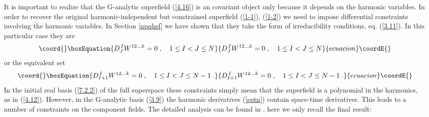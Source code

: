 \documentclass[a4paper,12pt]{article}
\begin{document}
It is important to realize that the G-analytic superfield 
(\ref{4.16}) is an \coordHE{} covariant object only because it 
depends on the harmonic variables. In order to recover the 
original harmonic-independent but constrained superfield \coordHE{} (\ref{1-1}), 
(\ref{1-2}) we need to impose differential constraints involving 
the harmonic variables. In Section \ref{npqhsf} we have shown that 
they take the form of \coordHE{} irreducibility conditions, 
eq. (\ref{3.11}). In this particular case they are 
\begin{equation}\coord{}\boxEquation{
  \label{a10'}
  D^{\,I}_J W^{12\ldots k} = 0\;, \quad 1\leq I<J \leq N
}{
  D^{\,I}_J W^{12\ldots k} = 0\;, \quad 1\leq I<J \leq N
}{ecuacion}\coordE{}\end{equation}
or the equivalent set 
\begin{equation}\coord{}\boxEquation{\label{a111}
  D^{\,I}_{I+1} W^{12\ldots k} = 0\;, \quad 1\leq I<J \leq N-1\;. 
}{D^{\,I}_{I+1} W^{12\ldots k} = 0\;, \quad 1\leq I<J \leq N-1\;. 
}{ecuacion}\coordE{}\end{equation}
In the initial real basis (\ref{7.2.2}) of the full superspace 
\coordHE{} these constraints simply mean that 
the superfield is a polynomial in the harmonics, as in 
(\ref{4.12}). However, in the G-analytic basis (\ref{3.9}) the 
harmonic derivatives (\ref{sptn}) contain space-time derivatives. 
This leads to a number of constraints on the component fields. The 
detailed analysis can be found in \cite{FS1}, here we only recall 
the final result: 
\end{document}
